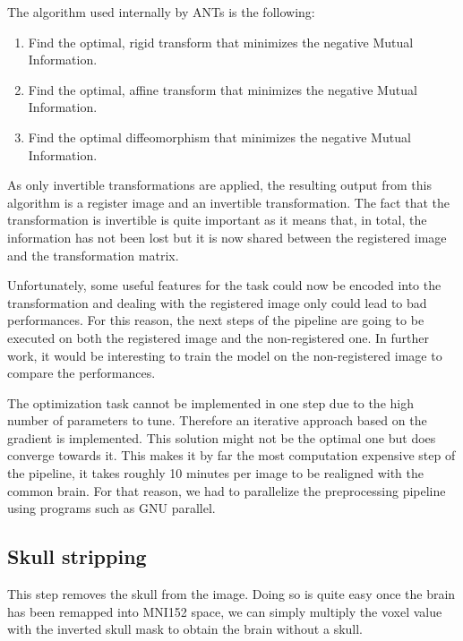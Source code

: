 The algorithm used internally by ANTs\footnotemark{} is the following:
\begin{enumerate}
\item Find the optimal, rigid transform that minimizes the negative Mutual Information.
\item Find the optimal, affine transform that minimizes the negative Mutual Information.
\item Find the optimal diffeomorphism that minimizes the negative Mutual Information.
\end{enumerate}
As only invertible transformations are applied, the resulting output from this algorithm is a register image and an invertible transformation. The fact that the transformation is invertible is quite important as it means that, in total, the information has not been lost but it is now shared between the registered image and the transformation matrix.

Unfortunately, some useful features for the task could now be encoded into the transformation and dealing with the registered image only could lead to bad performances. For this reason, the next steps of the pipeline are going to be executed on both the registered image and the non-registered one. In further work, it would be interesting to train the model on the non-registered image to compare the performances.
 
The optimization task cannot be implemented in one step due to the high number of parameters to tune. Therefore an iterative approach based on the gradient is implemented. This solution might not be the optimal one but does converge towards it. This makes it by far the most computation expensive step of the pipeline, it takes roughly 10 minutes per image to be realigned with the common brain. For that reason, we had to parallelize the preprocessing pipeline using programs such as GNU parallel\footnotemark{}.

\subsection{Skull stripping}
This step removes the skull from the image. Doing so is quite easy once the brain has been remapped into MNI152 space, we can simply multiply the voxel value with the inverted skull mask to obtain the brain without a skull. 

